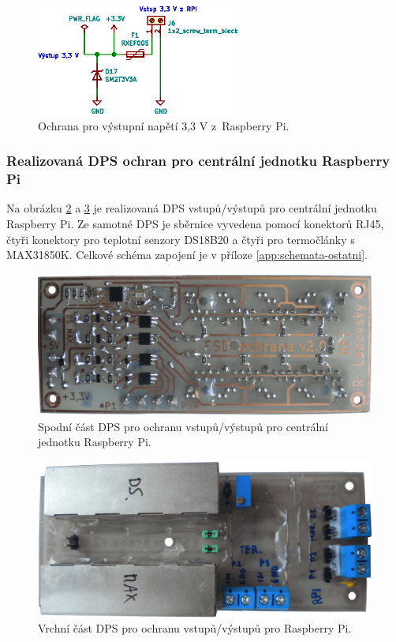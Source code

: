 \begin{figure}[H]
    \centering
    \includegraphics[width=0.6\textwidth]{images/svg/kicad/ochrana-napajeni-3_3-v.eps}
    \caption{Ochrana pro výstupní napětí 3,3 V z~Raspberry Pi.}
    \label{fig:ochrana-napajeni-3_3-v}
\end{figure}


\subsubsection{Realizovaná DPS ochran pro centrální jednotku Raspberry Pi}
Na obrázku \ref{fig:dps-rpi-1-wire-termostaty-ochrany-spodek} a \ref{fig:dps-rpi-1-wire-termostaty-ochrany-vrsek} je realizovaná DPS vstupů/výstupů pro centrální jednotku Raspberry Pi. Ze samotné DPS je sběrnice vyvedena pomocí konektorů RJ45, čtyři konektory pro teplotní senzory DS18B20 a čtyři pro termočlánky s MAX31850K. Celkové schéma zapojení je v příloze \ref{app:schemata-ostatni}.

\begin{figure}[H]
    \centering
    \includegraphics[width=\textwidth]{images/vstupy-vystupu-rpi/dps-rpi-1-wire-termostaty-ochrany-spodek.png}
    \caption{Spodní část DPS pro ochranu vstupů/výstupů pro centrální jednotku Raspberry Pi.}
    \label{fig:dps-rpi-1-wire-termostaty-ochrany-spodek}
\end{figure}

\begin{figure}[H]
    \centering
    \includegraphics[width=\textwidth]{images/vstupy-vystupu-rpi/dps-rpi-1-wire-termostaty-ochrany-vrsek.png}
    \caption{Vrchní část DPS pro ochranu vstupů/výstupů pro Raspberry Pi.}
    \label{fig:dps-rpi-1-wire-termostaty-ochrany-vrsek}
\end{figure}